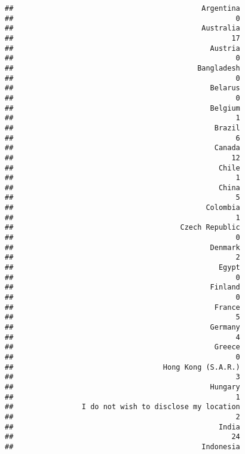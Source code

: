 \documentclass[
]{article}
\begin{document}
\begin{verbatim}
##                                            Argentina 
##                                                    0 
##                                            Australia 
##                                                   17 
##                                              Austria 
##                                                    0 
##                                           Bangladesh 
##                                                    0 
##                                              Belarus 
##                                                    0 
##                                              Belgium 
##                                                    1 
##                                               Brazil 
##                                                    6 
##                                               Canada 
##                                                   12 
##                                                Chile 
##                                                    1 
##                                                China 
##                                                    5 
##                                             Colombia 
##                                                    1 
##                                       Czech Republic 
##                                                    0 
##                                              Denmark 
##                                                    2 
##                                                Egypt 
##                                                    0 
##                                              Finland 
##                                                    0 
##                                               France 
##                                                    5 
##                                              Germany 
##                                                    4 
##                                               Greece 
##                                                    0 
##                                   Hong Kong (S.A.R.) 
##                                                    3 
##                                              Hungary 
##                                                    1 
##                I do not wish to disclose my location 
##                                                    2 
##                                                India 
##                                                   24 
##                                            Indonesia 

\end{verbatim}
\end{document}
